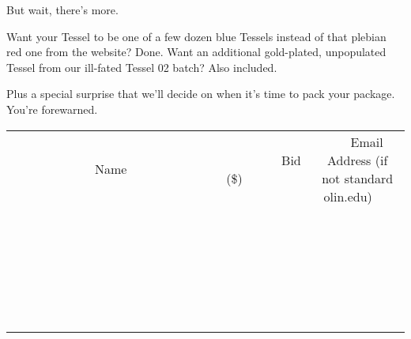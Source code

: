 \documentclass[11pt]{article}
\begin{document}
But wait, there's more.

Want your Tessel to be one of a few dozen blue Tessels instead of that plebian red one from the website? Done. Want an additional gold-plated, unpopulated Tessel from our ill-fated Tessel 02 batch? Also included.

Plus a special surprise that we'll decide on when it's time to pack your package. You're forewarned.
\\[6ex]
\begin{tabular}{c c c}
~~~~~~~~~~~~~Name~~~~~~~~~~~~~ & ~~~~~~~~~Bid (\$)~~~~~~~~~  & ~~~Email Address (if not standard olin.edu)~~~\\
 & & \\
\hline
 & & \\
\hline
 & & \\
\hline
 & & \\
\hline
 & & \\
\hline
 & & \\
\hline
 & & \\
\hline
 & & \\
\hline
 & & \\
\hline
 & & \\
\hline
 & & \\
\hline
 & & \\
\hline
 & & \\
\hline
 & & \\
\hline
 & & \\
\hline
 & & \\
\hline
 & & \\
\hline
 & & \\
\hline
 & & \\
\hline
 & & \\
\hline
 & & \\
\hline
 & & \\
\hline
 & & \\
\hline
 & & \\
\hline
 & & \\
\hline
 & & \\
\hline
\end{tabular}
\newpage
\end{document}
